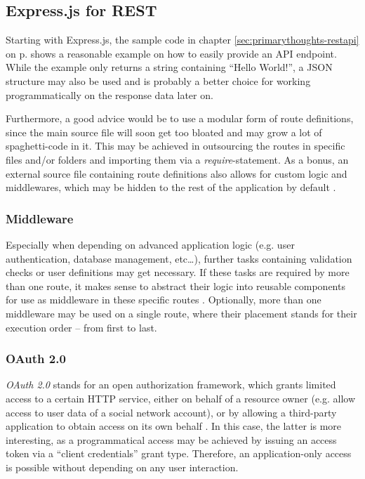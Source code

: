\subsection{Express.js for REST}
\label{sec:foundation-express}
Starting with Express.js, the sample code in chapter \ref{sec:primarythoughts-restapi} on p. \pageref{sec:primarythoughts-restapi} shows a reasonable example on how to easily provide an API endpoint. While the example only returns a string containing ``Hello World!'', a JSON structure may also be used and is probably a better choice for working programmatically on the response data later on.

Furthermore, a good advice would be to use a modular form of route definitions, since the main source file will soon get too bloated and may grow a lot of spaghetti-code in it. This may be achieved in outsourcing the routes in specific files and/or folders and importing them via a \emph{require}-statement. As a bonus, an external source file containing route definitions also allows for custom logic and middlewares, which may be hidden to the rest of the application by default \cite[p. 220f]{cantelon2017node}.

\subsubsection{Middleware}
Especially when depending on advanced application logic (e.g. user authentication, database management, etc\ldots), further tasks containing validation checks or user definitions may get necessary. If these tasks are required by more than one route, it makes sense to abstract their logic into reusable components for use as middleware in these specific routes \cite[223]{cantelon2017node}. Optionally, more than one middleware may be used on a single route, where their placement stands for their execution order -- from first to last.



\subsubsection{OAuth 2.0}
\label{sec:foundation-express-oauth}
\emph{OAuth 2.0} stands for an open authorization framework, which grants limited access to a certain HTTP service, either on behalf of a resource owner (e.g. allow access to user data of a social network account), or by allowing a third-party application to obtain access on its own behalf \cite[1]{hardt2012oauth}. In this case, the latter is more interesting, as a programmatical access may be achieved by issuing an access token via a ``client credentials'' grant type. Therefore, an application-only access is possible without depending on any user interaction.

